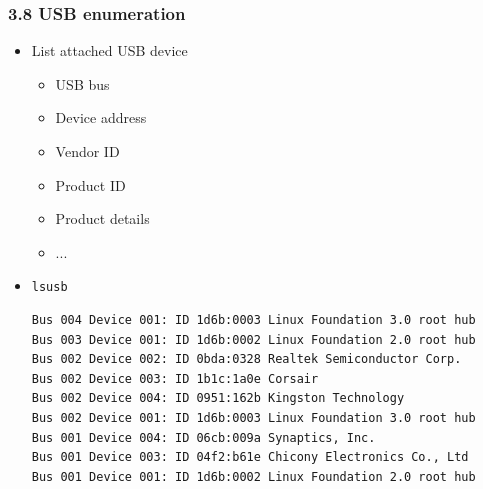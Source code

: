 \begin{frame}[fragile]
	\frametitle{3.8 USB enumeration}
    \begin{itemize}
        \item List attached USB device
        \begin{itemize}
            \item USB bus
            \item Device address
            \item Vendor ID
            \item Product ID
            \item Product details
            \item[] ...
        \end{itemize}
        \item[] \texttt{lsusb}
\begin{lstlisting}[basicstyle=\tiny]
Bus 004 Device 001: ID 1d6b:0003 Linux Foundation 3.0 root hub
Bus 003 Device 001: ID 1d6b:0002 Linux Foundation 2.0 root hub
Bus 002 Device 002: ID 0bda:0328 Realtek Semiconductor Corp. 
Bus 002 Device 003: ID 1b1c:1a0e Corsair 
Bus 002 Device 004: ID 0951:162b Kingston Technology 
Bus 002 Device 001: ID 1d6b:0003 Linux Foundation 3.0 root hub
Bus 001 Device 004: ID 06cb:009a Synaptics, Inc. 
Bus 001 Device 003: ID 04f2:b61e Chicony Electronics Co., Ltd 
Bus 001 Device 001: ID 1d6b:0002 Linux Foundation 2.0 root hub
\end{lstlisting}
    \end{itemize}
\end{frame}


